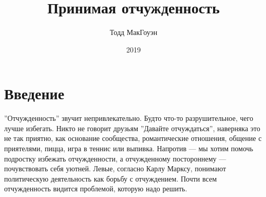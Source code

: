 \documentclass[12pt]{book}
\title{Принимая отчужденность}
\author{Тодд МакГоуэн}
\date{2019}
\begin{document}

\null
    \thispagestyle{empty}%
    \addtocounter{page}{-1}%
    \newpage

\tableofcontents

\chapter{Введение}

''Отчужденность'' звучит непривлекательно. Будто что-то разрушительное, чего лучше избегать. Никто не говорит друзьям ''Давайте отчуждаться'', наверняка это не так приятно, как основание сообщества, романтические отношения, общение с приятелями, пицца, игра в теннис или выпивка. Напротив --- мы хотим помочь подростку избежать отчужденности, а отчужденному постороннему --- почувствовать себя уютней. Левые, согласно Карлу Марксу, понимают политическую деятельность как борьбу с отчуждением. Почти всем отчужденность видится проблемой, которую надо решить.
\end{document}
